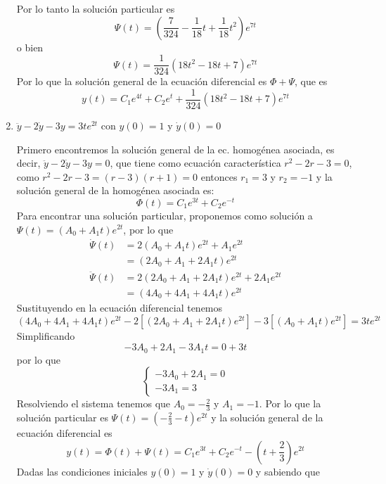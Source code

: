 \documentclass{article}
\begin{document}
\begin{enumerate}
{            Por lo tanto la solución particular es
            $$\Psi(t)=\left(\frac{7}{324}-\frac{1}{18}t+\frac{1}{18}t^2\right)e^{7t}$$
            o bien
            $$\Psi(t)=\frac{1}{324}(18t^2-18t+7)e^{7t}$$
            Por lo que la solución general de la ecuación diferencial es $\Phi+\Psi$, que es
            $$y(t)=C_1e^{4t}+C_2e^{t}+\frac{1}{324}(18t^2-18t+7)e^{7t}$$
        }
        \item {
            $\ddot y-2\dot y-3y=3te^{2t}$ con $y(0)=1$ y $\dot y(0)=0$

            \color{azul}
            Primero encontremos la solución general de la ec. homogénea asociada, es decir,
            $\ddot y-2\dot y-3y=0$, que tiene como ecuación característica $r^2-2r-3=0$, como
            $r^2-2r-3 = (r-3)(r+1) = 0$ entonces $r_1=3$ y $r_2=-1$ y la solución general de la
            homogénea asociada es:
            $$\Phi(t)=C_1e^{3t}+C_2e^{-t}$$
            Para encontrar una solución particular, proponemos como solución a
            $\Psi(t)=(A_0+A_1t)e^{2t}$, por lo que
            \begin{align*}
                \dot\Psi(t)
                &= 2(A_0+A_1t)e^{2t}+A_1e^{2t} \\
                &= (2A_0+A_1+2A_1t)e^{2t} \\
                \ddot\Psi(t)
                &= 2(2A_0+A_1+2A_1t)e^{2t}+2A_1e^{2t} \\
                &= (4A_0+4A_1+4A_1t)e^{2t}
            \end{align*}
            Sustituyendo en la ecuación diferencial tenemos
            $$(4A_0+4A_1+4A_1t)e^{2t}-2[(2A_0+A_1+2A_1t)e^{2t}]-3[(A_0+A_1t)e^{2t}]=3te^{2t}$$
            Simplificando
            $$-3A_0+2A_1-3A_1t=0+3t$$
            por lo que
            \begin{equation*}
                \begin{cases}
                    -3A_0+2A_1 = 0\\
                    -3A_1 = 3
                \end{cases}
            \end{equation*}
            Resolviendo el sistema tenemos que $A_0=-\frac{2}{3}$ y $A_1=-1$. Por lo que la
            solución particular es $\Psi(t)=(-\frac{2}{3}-t)e^{2t}$ y la solución general de la
            ecuación diferencial es 
            $$y(t)=\Phi(t)+\Psi(t)=C_1e^{3t}+C_2e^{-t}-\left(t+\frac{2}{3}\right)e^{2t}$$
            Dadas las condiciones iniciales $y(0)=1$ y $\dot y(0)=0$ y sabiendo que
}
\end{enumerate}
\end{document}
